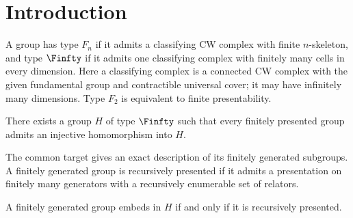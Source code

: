 \section{Introduction}\label{sec:introduction}

A group has type $F_n$ if it admits a classifying CW complex with finite
$n$-skeleton, and type $\Finfty$ if it admits one classifying complex
with finitely many cells in every dimension. Here a classifying complex
is a connected CW complex with the given fundamental group and
contractible universal cover; it may have infinitely many dimensions.
Type $F_2$ is equivalent to finite presentability.

\begin{theorem}\label{thm:main}
There exists a group $H$ of type $\Finfty$ such that every finitely
presented group admits an injective homomorphism into $H$.
\end{theorem}

The common target gives an exact description of its finitely generated
subgroups. A finitely generated group is recursively presented if it
admits a presentation on finitely many generators with a recursively
enumerable set of relators.

\begin{corollary}\label{cor:recursive}
A finitely generated group embeds in $H$ if and only if it is
recursively presented.
\end{corollary}
